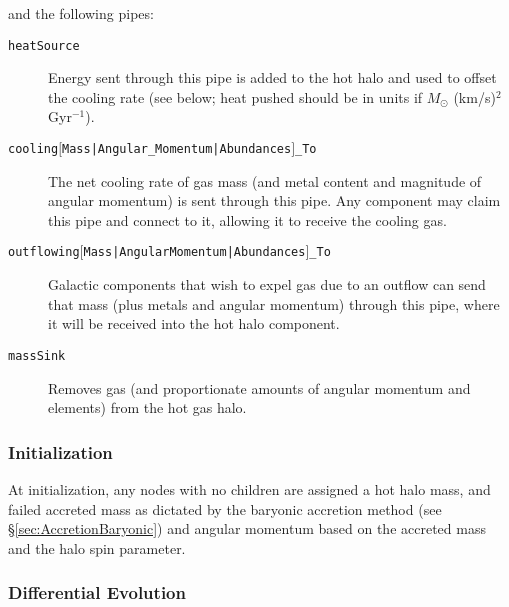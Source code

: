 and the following pipes:
\begin{description}
 \item [{\tt heatSource}] Energy sent through this pipe is added to the hot halo and used to offset the cooling rate (see below; heat pushed should be in units if $M_\odot$ (km/s)$^2$ Gyr$^{-1}$).
 \item [{\tt cooling$[$Mass|Angular\_Momentum|Abundances$]$\_To}] The net cooling rate of gas mass (and metal content and magnitude of angular momentum) is sent through this pipe. Any \gls{component} may claim this pipe and connect to it, allowing it to receive the cooling gas.
 \item [{\tt outflowing$[$Mass|AngularMomentum|Abundances$]$\_To}] Galactic components that wish to expel gas due to an outflow can send that mass (plus metals and angular momentum) through this pipe, where it will be received into the hot halo component. 
 \item [{\tt massSink}] Removes gas (and proportionate amounts of angular momentum and elements) from the hot gas halo.
\end{description}

\subsubsection{Initialization}

At initialization, any nodes with no children are assigned a hot halo mass, and failed accreted mass as dictated by the baryonic accretion method (see \S\ref{sec:AccretionBaryonic}) and angular momentum based on the accreted mass and the halo spin parameter.

\subsubsection{Differential Evolution}

